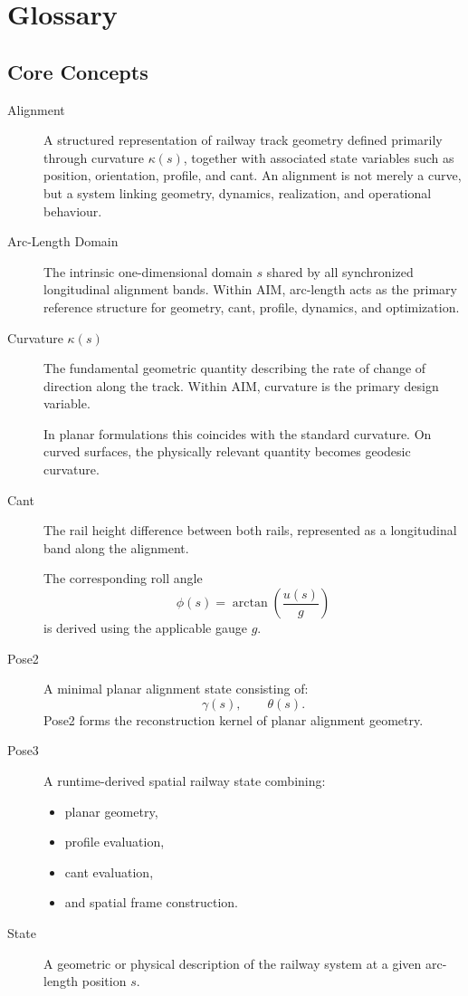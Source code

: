 
\chapter*{Glossary}

\section*{Core Concepts}

\begin{description}

\item[Alignment]
A structured representation of railway track geometry defined primarily
through curvature \(\kappa(s)\), together with associated state
variables such as position, orientation, profile, and cant.
An alignment is not merely a curve, but a system linking geometry,
dynamics, realization, and operational behaviour.

\item[Arc-Length Domain]
The intrinsic one-dimensional domain \(s\) shared by all synchronized
longitudinal alignment bands.
Within AIM, arc-length acts as the primary reference structure for
geometry, cant, profile, dynamics, and optimization.

\item[Curvature \(\kappa(s)\)]
The fundamental geometric quantity describing the rate of change of
direction along the track.
Within AIM, curvature is the primary design variable.

In planar formulations this coincides with the standard curvature.
On curved surfaces, the physically relevant quantity becomes geodesic
curvature.

\item[Cant]
The rail height difference between both rails, represented as a
longitudinal band along the alignment.

The corresponding roll angle
\[
\phi(s)
=
\arctan\!\left(\frac{u(s)}{g}\right)
\]
is derived using the applicable gauge \(g\).

\item[Pose2]
A minimal planar alignment state consisting of:
\[
\gamma(s),
\qquad
\theta(s).
\]
Pose2 forms the reconstruction kernel of planar alignment geometry.

\item[Pose3]
A runtime-derived spatial railway state combining:
\begin{itemize}
\item planar geometry,
\item profile evaluation,
\item cant evaluation,
\item and spatial frame construction.
\end{itemize}

\item[State]
A geometric or physical description of the railway system at a given
arc-length position \(s\).

\end{description}

